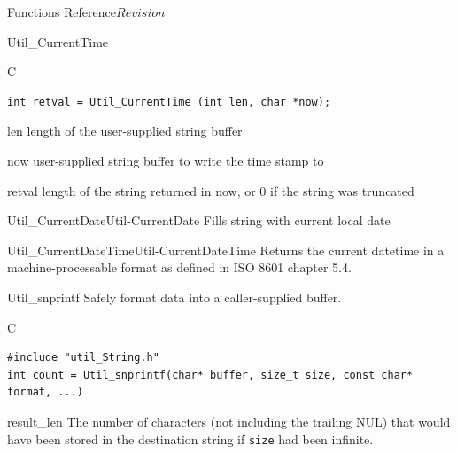 \begin{cactuspart}{ Functions Reference}{}{$Revision$}
\begin{FunctionDescription}{Util\_CurrentTime}
\begin{SynopsisSection}
\begin{Synopsis}{C}
\begin{verbatim}
int retval = Util_CurrentTime (int len, char *now);
\end{verbatim}
\end{Synopsis}
\end{SynopsisSection}

\begin{ParameterSection}
\begin{Parameter}{len}
length of the user-supplied string buffer
\end{Parameter}
\begin{Parameter}{now}
user-supplied string buffer to write the time stamp to
\end{Parameter}
\end{ParameterSection}

\begin{ResultSection}
\begin{Result}{retval}
length of the string returned in {\code now}, or 0 if the string was truncated
\end{Result}
\end{ResultSection}

\begin{SeeAlsoSection}
\begin{SeeAlso2}{Util\_CurrentDate}{Util-CurrentDate}
  Fills string with current local date
\end{SeeAlso2}
\begin{SeeAlso2}{Util\_CurrentDateTime}{Util-CurrentDateTime}
  Returns the current datetime in a machine-processable format
as defined in ISO 8601 chapter 5.4.
\end{SeeAlso2}
\end{SeeAlsoSection}

\end{FunctionDescription}


\begin{FunctionDescription}{Util\_snprintf}
\label{Util-snprintf}
Safely format data into a caller-supplied buffer.

\begin{SynopsisSection}
\begin{Synopsis}{C}
\begin{verbatim}
#include "util_String.h"
int count = Util_snprintf(char* buffer, size_t size, const char* format, ...)
\end{verbatim}
\end{Synopsis}
\end{SynopsisSection}

\begin{ResultSection}
\begin{Result}{result\_len}
The number of characters (not including the trailing NUL) that would
have been stored in the destination string if \verb|size| had been infinite.
\end{Result}
\end{ResultSection}


\end{FunctionDescription}
\end{cactuspart}

